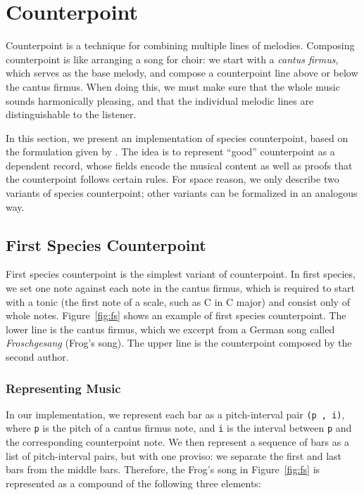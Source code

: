 \section{Counterpoint}
\label{sec:cp}

Counterpoint is a technique for combining multiple lines of melodies.
Composing counterpoint is like arranging a song for choir:
we start with a \emph{cantus firmus}, which serves as the base melody,
and compose a counterpoint line above or below the cantus firmus.
When doing this, we must make sure that the whole music sounds
harmonically pleasing, and that the individual melodic lines are
distinguishable to the listener.

In this section, we present an implementation of species counterpoint,
based on the formulation given by \citet{fux-cp}.
The idea is to represent ``good'' counterpoint  as a dependent record,
whose fields encode the musical content as well as proofs that the
counterpoint follows certain rules.
For space reason, we only describe two variants of species counterpoint;
other variants can be formalized in an analogous way.

\subsection{First Species Counterpoint}
\label{sec:cp:fs}

\FS

First species counterpoint is the simplest variant of counterpoint.
In first species, we set one note against each note in the cantus firmus,
which is required to start with a tonic (the first note of a scale,
such as C in C major) and consist only of whole notes.
Figure~\ref{fig:fs} shows an example of first species counterpoint.
The lower line is the cantus firmus, which we excerpt from a German
song called \emph{Froschgesang} (Frog's song).
The upper line is the counterpoint composed by the second author.

\subsubsection{Representing Music}

In our implementation, we represent each bar as a pitch-interval pair
\texttt{(p ,  i)}, where \texttt{p} is the pitch of a cantus firmus note,
and \texttt{i} is the interval between \texttt{p} and the corresponding
counterpoint note.
We then represent a sequence of bars as a list of pitch-interval pairs,
but with one proviso: we separate the first and last bars from the
middle bars.
Therefore, the Frog's song in Figure~\ref{fig:fs} is represented as a
compound of the following three elements:

